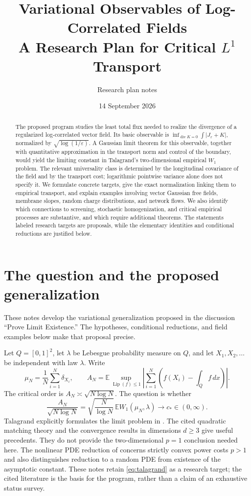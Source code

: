 \documentclass[11pt]{article}
\title{Variational Observables of Log-Correlated Fields\\[4pt]
\large A Research Plan for Critical $L^1$ Transport}
\author{Research plan notes}
\date{14 September 2026}
\theoremstyle{definition}
\newcommand{\E}{\mathbb E}
\newcommand{\Lip}{\operatorname{Lip}}
\newcommand{\diver}{\operatorname{div}}
\newcommand{\dd}{\,dx}
\begin{document}
\maketitle

\begin{abstract}
The proposed program studies the least total flux needed to realize the
divergence of a regularized log-correlated vector field. Its basic observable is
$\inf_{\diver K=0}\int|J_\varepsilon+K|$, normalized by
$\sqrt{\log(1/\varepsilon)}$. A Gaussian limit theorem for this observable,
together with quantitative approximation in the transport norm and control
of the boundary, would yield the limiting constant in Talagrand's
two-dimensional empirical $W_1$ problem. The relevant universality class is
determined by the longitudinal covariance of the field and by the transport
cost; logarithmic pointwise variance alone does not specify it. We formulate
concrete targets, give the exact normalization linking them to empirical
transport, and explain examples involving vector Gaussian free fields,
membrane slopes, random charge distributions, and network flows. We also
identify which connections to screening, stochastic homogenization, and
critical empirical processes are substantive, and which require additional
theorems. The statements labeled research targets are proposals, while the
elementary identities and conditional reductions are justified below.
\end{abstract}

\section{The question and the proposed generalization}
\label{sec:aim}

These notes develop the variational generalization proposed in the
discussion ``Prove Limit Existence.'' The hypotheses, conditional
reductions, and field examples below make that proposal precise.

Let $Q=[0,1]^2$, let $\lambda$ be Lebesgue probability measure on $Q$, and
let $X_1,X_2,\ldots$ be independent with law $\lambda$. Write
\[
  \mu_N=\frac1N\sum_{i=1}^N\delta_{X_i},\qquad
  A_N=\E\sup_{\Lip(f)\leq1}
  \left|\sum_{i=1}^N\left(f(X_i)-\int_Q f\dd\right)\right|.
\]
The critical order is $A_N\asymp\sqrt{N\log N}$. The question is whether
\begin{equation}\label{eq:talagrand}
  \frac{A_N}{\sqrt{N\log N}}
  =\sqrt{\frac N{\log N}}\,\E W_1(\mu_N,\lambda)
  \longrightarrow c_*\in(0,\infty).
\end{equation}
Talagrand explicitly formulates the limit problem in
\cite[Research Problem 4.5.4]{Talagrand}. The cited quadratic matching theory
\cite{AST} and the convergence results in dimensions $d\geq3$ \cite{GT}
give useful precedents. They do not provide the two-dimensional $p=1$
conclusion needed here. The nonlinear PDE reduction of \cite{AVT} concerns
strictly convex power costs $p>1$ and also distinguishes reduction to a
random PDE from existence of the asymptotic constant. These notes retain
\eqref{eq:talagrand} as a research target; the cited literature is the basis
for the program, rather than a claim of an exhaustive status survey.
\end{document}
